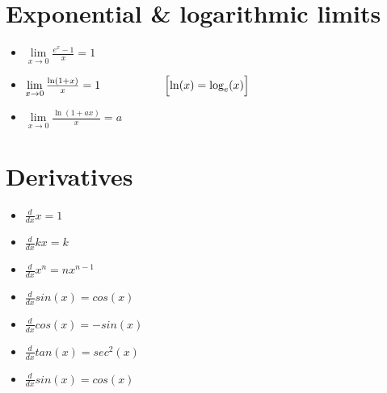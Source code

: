 \documentclass{article}
\begin{document}
\section{Exponential \& logarithmic limits}
\begin{itemize}
\item $\lim\limits_{x \to 0}\frac{e^x - 1}{x} = 1$
\item $\lim\limits_{x \to 0}\frac{\ln(1+x)}{x} = 1 \hspace{2cm} \Bigl[\ln(x) = \log_e(x)\Bigr] $
\item $\lim\limits_{x \to 0}\frac{\ln(1 + ax)}{x} = a$
\end{itemize}

\section{Derivatives}
\begin{itemize}
\item $\frac{d}{dx}x = 1$
\item $\frac{d}{dx}kx = k$
\item $\frac{d}{dx}x^n = nx^{n-1}$
\item $\frac{d}{dx}sin(x) = cos(x)$
\item $\frac{d}{dx}cos(x) = -sin(x)$
\item $\frac{d}{dx}tan(x) = sec^2(x)$
\item $\frac{d}{dx}sin(x) = cos(x)$

\end{itemize}
\end{document}
